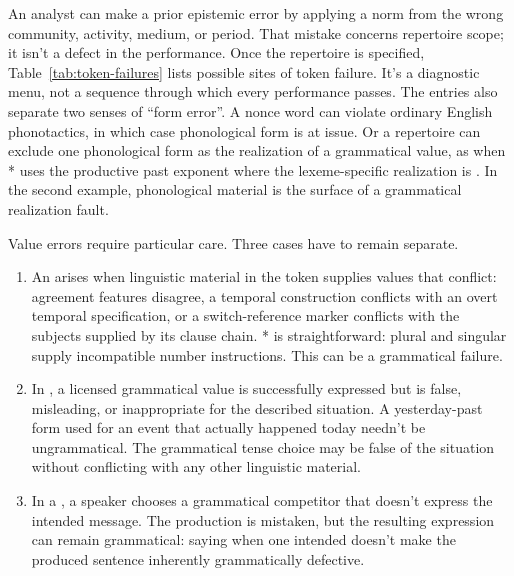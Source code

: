 \documentclass[12pt,letterpaper]{article}
\begin{document}
An analyst can make a prior epistemic error by applying a norm from the wrong
community, activity, medium, or period. That mistake concerns repertoire scope;
it isn't a defect in the performance. Once the repertoire is specified,
Table~\ref{tab:token-failures} lists possible sites of token failure. It's a
diagnostic menu, not a sequence through which every performance passes. The
entries also
separate two senses of \enquote{form error}. A nonce word can violate ordinary
English phonotactics, in which case phonological form is at issue. Or a repertoire can
exclude one phonological form as the realization of a grammatical value, as when
* uses the productive past exponent where the lexeme-specific
realization is  \citep[1596--1598, 1607]{huddleston2002}. In the
second example, phonological material is the
surface of a grammatical realization fault.

Value errors require particular care. Three cases have to remain separate.

\begin{enumerate}
  \item An  arises when linguistic material
    in the token supplies values that conflict: agreement features disagree, a
    temporal construction conflicts with an overt temporal specification, or a
    switch-reference marker conflicts with the subjects supplied by its clause
    chain. * is straightforward: plural
     and singular  supply incompatible number
    instructions. This can be a grammatical failure.
  \item In , a licensed grammatical value is
    successfully expressed but is false, misleading, or inappropriate for the
    described situation. A yesterday-past form used for an event that actually
    happened today needn't be ungrammatical. The grammatical tense choice may be
    false of the situation without conflicting with any other linguistic material.
  \item In a , a speaker chooses a grammatical
    competitor that doesn't express the intended message. The production is
    mistaken, but the resulting expression can remain grammatical: saying
     when one intended  doesn't make the
    produced sentence inherently grammatically defective.
\end{enumerate}
\end{document}

